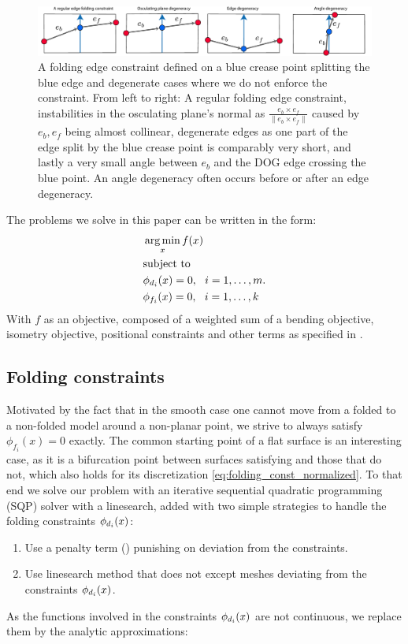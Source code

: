 \begin{figure} [h]
	\centering
	\includegraphics[width=\linewidth]{figures/fold_const_degeneracies}
	\caption{A folding edge constraint defined on a blue crease point splitting the blue edge and degenerate cases where we do not enforce the constraint. From left to right: A regular folding edge constraint, instabilities in the osculating plane's normal as $\frac{e_b \times e_f}{\|e_b \times e_f\|}$ caused by $e_b,e_f$ being almost collinear, degenerate edges as one part of the edge split by the blue crease point is comparably very short, and lastly a very small angle between $e_b$ and the DOG edge crossing the blue point. An angle degeneracy often occurs before or after an edge degeneracy.}
	\label{fig:fold_const_degeneracies}
\end{figure}

The problems we solve in this paper can be written in the form:
\begin{equation} \label{eq:const_opt}
\begin{aligned}
& \operatorname*{arg\,min}_x f(x) \\
& \textrm{subject to} \\
& \phi_{d_i}(x) = 0, \ \  i = 1, \ldots, m. \\
& \phi_{f_i}(x) = 0, \ \  i = 1, \ldots, k \\ 
\end{aligned}
\end{equation}
With $f$ as an objective, composed of a weighted sum of a bending objective, isometry objective, positional constraints and other terms as specified in .

\subsection{Folding constraints}
Motivated by the fact that in the smooth case one cannot move from a folded to a non-folded model around a non-planar point, we strive to always satisfy $\phi_{f_i}(x) = 0$ exactly. The common starting point of a flat surface is an interesting case, as it is a bifurcation point between surfaces satisfying  and those that do not, which also holds for its discretization \eqref{eq:folding_const_normalized}. To that end we solve our problem with an iterative sequential quadratic programming (SQP) solver with a linesearch, added with two simple strategies to handle the folding constraints $\phi_{d_i}(x)$:
\begin{enumerate}
	\item Use a penalty term (\cite{nocedal}) punishing on deviation from the constraints. \label{opt:penalty}
	\item Use linesearch method that does not except meshes deviating from the constraints $\phi_{d_i}(x)$.
\end{enumerate}
As the functions involved in the constraints $\phi_{d_i}(x)$ are not continuous, we replace them by the analytic approximations:


